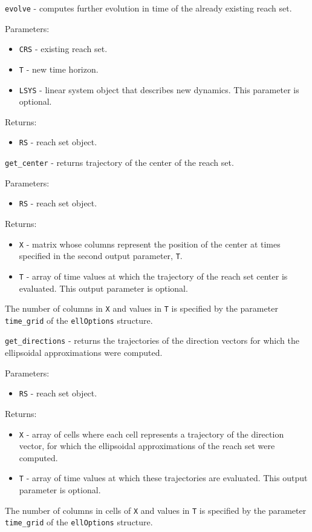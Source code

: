{\Large {\tt evolve}} - computes further evolution in time of the already
existing reach set.

Parameters:
\begin{itemize}
\item {\tt CRS} - existing reach set.
\item {\tt T} - new time horizon.
\item {\tt LSYS} - linear system object that describes new dynamics.
This parameter is optional.
\end{itemize}

Returns:
\begin{itemize}
\item {\tt RS} - reach set object.
\end{itemize}

\newpage

{\Large {\tt get\_center}} - returns trajectory of the center of the reach set.

Parameters:
\begin{itemize}
\item {\tt RS} - reach set object.
\end{itemize}

Returns:
\begin{itemize}
\item {\tt X} - matrix whose columns represent the position of the center
at times specified in the second output parameter, {\tt T}.
\item {\tt T} - array of time values at which the trajectory of the reach set
center is evaluated. This output parameter is optional.
\end{itemize}
The number of columns in {\tt X} and values in {\tt T}
is specified by the parameter
{\tt time\_grid} of the {\tt ellOptions} structure.

\newpage

{\Large {\tt get\_directions}} - returns the trajectories of the direction
vectors for which the ellipsoidal approximations were computed.

Parameters:
\begin{itemize}
\item {\tt RS} - reach set object.
\end{itemize}

Returns:
\begin{itemize}
\item {\tt X} - array of cells where each cell represents a trajectory
of the direction vector, for which the ellipsoidal approximations of the
reach set were computed.
\item {\tt T} - array of time values at which these trajectories
are evaluated. This output parameter is optional.
\end{itemize}
The number of columns in cells of {\tt X} and values in {\tt T} is specified by
the parameter {\tt time\_grid} of the {\tt ellOptions} structure.

